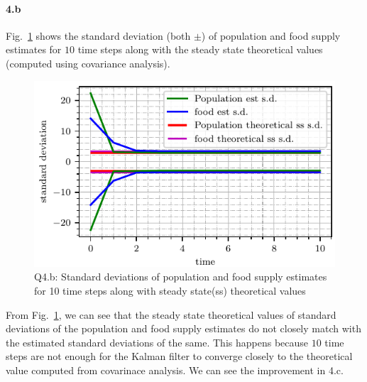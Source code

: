 \paragraph{4.b}Fig.~\ref{fig:q4_std_dev_theoretical} shows the standard deviation (both $\pm$) of population and food supply estimates for $10$ time steps along with the steady state theoretical values (computed using covariance analysis).
\begin{figure}[!h]
	\centering
	\includegraphics[scale=1.0,trim={0cm 0cm 0cm 0cm},clip]{./code/generatedPlots/q4_std_dev_theoretical.pdf}
	\caption{Q4.b: Standard deviations of population and food supply estimates for 10 time steps along with steady state(ss) theoretical values}
	\label{fig:q4_std_dev_theoretical}
\end{figure}
From Fig.~\ref{fig:q4_std_dev_theoretical}, we can see that the steady state theoretical values of standard deviations of the population and food supply estimates do not closely match with the estimated standard deviations of the same. This happens because $10$ time steps are not enough for the Kalman filter to converge closely to the theoretical value computed from covarinace analysis. We can see the improvement in 4.c.
